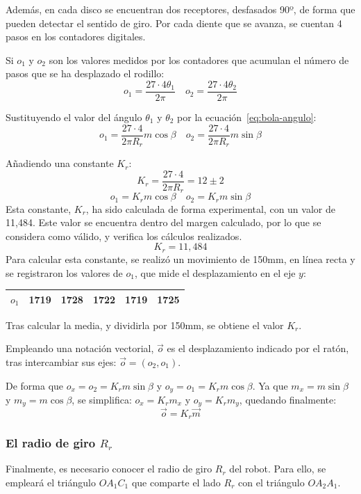 \documentclass[10pt,a4paper,hidelinks,twocolumn]{article}
\begin{document}
Además, en cada disco se encuentran dos receptores, desfasados 90º, de forma que 
pueden detectar el sentido de giro. Por cada diente que se avanza, se cuentan 4 
pasos en los contadores digitales.

Si $o_1$ y $o_2$ son los valores medidos por los contadores que acumulan el 
número de pasos que se ha desplazado el rodillo:
$$o_1 = \frac{27 \cdot 4 \theta_1}{2\pi} \quad 
o_2 = \frac{27 \cdot 4 \theta_2}{2\pi}$$

Sustituyendo el valor del ángulo $\theta_1$ y $\theta_2$ por la 
ecuación~\ref{eq:bola-angulo}:
$$ o_1 = \frac{27\cdot4}{2 \pi R_r} m \cos \beta \quad
	o_2 = \frac{27\cdot4}{2 \pi R_r} m \sin \beta $$

Añadiendo una constante $K_r$:
$$K_r = \frac{27\cdot4}{2 \pi R_r} = 12\pm2$$
$$ o_1 = K_r m \cos \beta \quad
	o_2 = K_r m \sin \beta $$
Esta constante, $K_r$, ha sido calculada de forma experimental, con un valor de 
11,484. Este valor se encuentra dentro del margen calculado, por lo que se 
considera como válido, y verifica los cálculos realizados.
$$K_r = 11,484$$
Para calcular esta constante, se realizó un movimiento de 150mm, en línea recta 
y se registraron los valores de $o_1$, que mide el desplazamiento en el eje $y$:

\begin{center}
\begin{tabular}{ | c | c | c | c | c | c |}
\hline
$o_1$ & 1719 & 1728 & 1722 & 1719 & 1725 \\ \hline
\end{tabular}
\end{center}

Tras calcular la media, y dividirla por 150mm, se obtiene el valor $K_r$.

Empleando una notación vectorial, $\vec{o}$ es el desplazamiento indicado por el 
ratón, tras intercambiar sus ejes: $\vec{o} = (o_2, o_1)$.

De forma que $o_x = o_2 = K_r m \sin \beta$ y $o_y = o_1 = K_r m \cos \beta$. Ya 
que $m_x = m \sin \beta$ y $m_y = m \cos \beta$, se simplifica: $o_x = K_r m_x$ 
y $o_y = K_r m_y$, quedando finalmente:
$$ \vec{o} = K_r \vec{m} $$

\subsubsection{El radio de giro $R_r$}
Finalmente, es necesario conocer el radio de giro $R_r$ del robot. Para ello, se 
empleará el triángulo $OA_1C_1$ que comparte el lado $R_r$ con el triángulo 
$OA_2A_1$.
\end{document}
